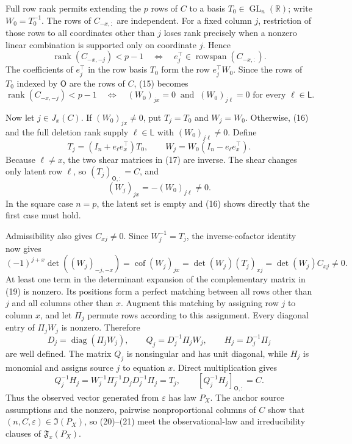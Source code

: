 Full row rank permits extending the \(p\) rows of \(C\) to a basis \(T_0\in\operatorname{GL}_n(\mathbb R)\); write \(W_0=T_0^{-1}\). The rows of \(C_{-x,:}\) are independent. For a fixed column \(j\), restriction of those rows to all coordinates other than \(j\) loses rank precisely when a nonzero linear combination is supported only on coordinate \(j\). Hence
\[
 \operatorname{rank}(C_{-x,-j})<p-1
 \quad\Longleftrightarrow\quad
 e_j^\top\in\operatorname{rowspan}(C_{-x,:}). \tag{15}
\]
The coefficients of \(e_j^\top\) in the row basis \(T_0\) form the row \(e_j^\top W_0\). Since the rows of \(T_0\) indexed by \(\mathsf O\) are the rows of \(C\), (15) becomes
\[
 \operatorname{rank}(C_{-x,-j})<p-1
 \quad\Longleftrightarrow\quad
 (W_0)_{jx}=0\ \text{ and }\ (W_0)_{j\ell}=0
 \text{ for every }\ell\in\mathsf L. \tag{16}
\]

Now let \(j\in J_x(C)\). If \((W_0)_{jx}\ne0\), put \(T_j=T_0\) and \(W_j=W_0\). Otherwise, (16) and the full deletion rank supply \(\ell\in\mathsf L\) with \((W_0)_{j\ell}\ne0\). Define
\[
 T_j=(I_n+e_\ell e_x^\top)T_0,
 \qquad
 W_j=W_0(I_n-e_\ell e_x^\top). \tag{17}
\]
Because \(\ell\ne x\), the two shear matrices in (17) are inverse. The shear changes only latent row \(\ell\), so \((T_j)_{\mathsf O,:}=C\), and
\[
 (W_j)_{jx}=-(W_0)_{j\ell}\ne0. \tag{18}
\]
In the square case \(n=p\), the latent set is empty and (16) shows directly that the first case must hold.

Admissibility also gives \(C_{xj}\ne0\). Since \(W_j^{-1}=T_j\), the inverse-cofactor identity now gives
\[
 (-1)^{j+x}\det((W_j)_{-j,-x})
 =\operatorname{cof}(W_j)_{jx}
 =\det(W_j)(T_j)_{xj}
 =\det(W_j)C_{xj}\ne0. \tag{19}
\]
At least one term in the determinant expansion of the complementary matrix in (19) is nonzero. Its positions form a perfect matching between all rows other than \(j\) and all columns other than \(x\). Augment this matching by assigning row \(j\) to column \(x\), and let \(\Pi_j\) permute rows according to this assignment. Every diagonal entry of \(\Pi_jW_j\) is nonzero. Therefore
\[
 D_j=\operatorname{diag}(\Pi_jW_j),
 \qquad
 Q_j=D_j^{-1}\Pi_jW_j,
 \qquad
 H_j=D_j^{-1}\Pi_j \tag{20}
\]
are well defined. The matrix \(Q_j\) is nonsingular and has unit diagonal, while \(H_j\) is monomial and assigns source \(j\) to equation \(x\). Direct multiplication gives
\[
 Q_j^{-1}H_j=W_j^{-1}\Pi_j^{-1}D_jD_j^{-1}\Pi_j=T_j,
 \qquad
 [Q_j^{-1}H_j]_{\mathsf O,:}=C. \tag{21}
\]
Thus the observed vector generated from \(\varepsilon\) has law \(P_X\). The anchor source assumptions and the nonzero, pairwise nonproportional columns of \(C\) show that \((n,C,\varepsilon)\in\mathfrak I(P_X)\), so (20)--(21) meet the observational-law and irreducibility clauses of \(\mathfrak F_x(P_X)\).

